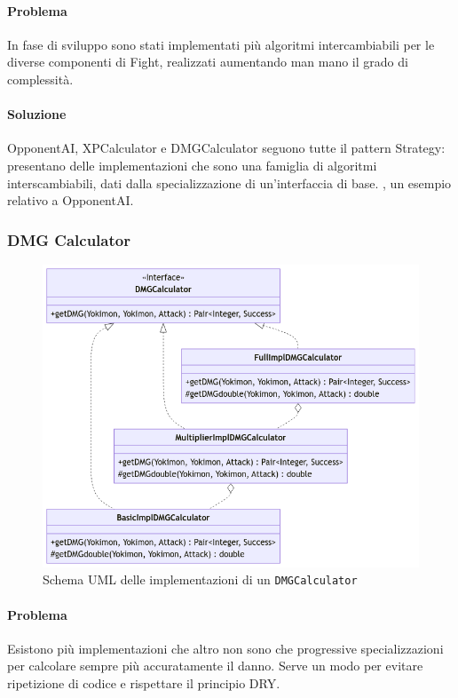 \documentclass[a4paper,12pt]{report}
\begin{document}
\paragraph{Problema} In fase di sviluppo sono stati implementati più algoritmi intercambiabili per le diverse componenti di Fight, realizzati aumentando man mano il grado di complessità.
\paragraph{Soluzione} OpponentAI, XPCalculator e DMGCalculator seguono tutte il pattern Strategy: presentano delle implementazioni che sono una famiglia di algoritmi interscambiabili, dati dalla specializzazione di un’interfaccia di base.
%
, un esempio relativo a OpponentAI.
\subsubsection{DMG Calculator}
\begin{figure}[H]
\centering{}
\includegraphics[width=1.0\columnwidth]{images/uml-dmgcalc.png}
\caption{Schema UML delle implementazioni di un \texttt{DMGCalculator}}
\label{img:uml-dmgcalc}
\end{figure}
\paragraph{Problema} Esistono più implementazioni che altro non sono che progressive specializzazioni per calcolare sempre più accuratamente il danno.
%
Serve un modo per evitare ripetizione di codice e rispettare il principio DRY.
\end{document}
